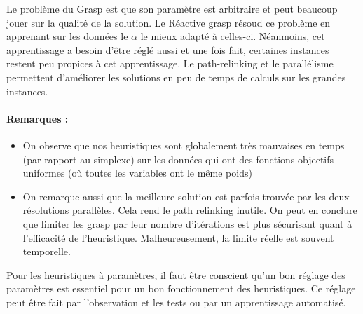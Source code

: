 


\vspace{5mm}
\noindent
{}
\vspace{2mm}


Le problème du Grasp est que son paramètre est arbitraire et peut beaucoup jouer sur la qualité de la solution.
Le Réactive grasp résoud ce problème en apprenant sur les données le $\alpha$ le mieux adapté à celles-ci. Néanmoins, cet apprentissage a besoin d'être réglé aussi et une fois fait, certaines instances restent peu propices à cet apprentissage.
Le path-relinking et le parallélisme permettent d'améliorer les solutions en peu de temps de calculs sur les grandes instances. 






\paragraph{Remarques : }
\begin{itemize}
\item On observe que nos heuristiques sont globalement très mauvaises en temps (par rapport au simplexe) sur les données qui ont des fonctions objectifs uniformes (où toutes les variables ont le même poids)
\item On remarque aussi que la meilleure solution est parfois trouvée par les deux résolutions parallèles. Cela rend le path relinking inutile. On peut en conclure que limiter les grasp par leur nombre d'itérations est plus sécurisant quant à l'efficacité de l'heuristique. Malheureusement, la limite réelle est souvent temporelle.
\end{itemize}

Pour les heuristiques à paramètres, il faut être conscient qu'un bon réglage des paramètres est essentiel pour un bon fonctionnement des heuristiques. Ce réglage peut être fait par l'observation et les tests ou par un apprentissage automatisé. 


\vfill
\break





